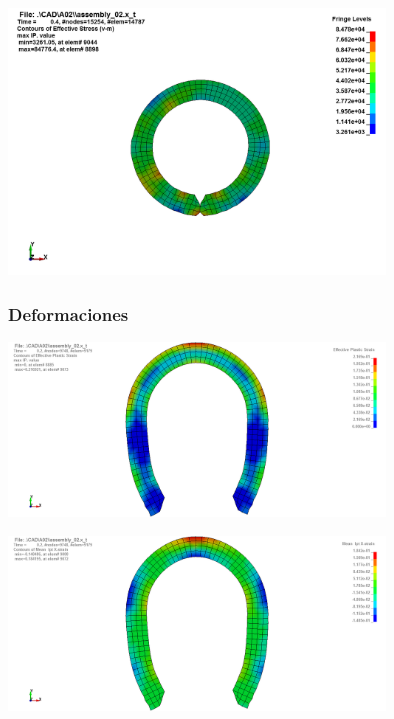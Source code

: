\begin{center}
\includegraphics[width=0.75\textwidth]{src/ch4/von_mises_02.png}
\label{fig:von_mises_01}
\end{center}


\subsubsection{Deformaciones}

\begin{center}
\includegraphics[width=0.75\textwidth]{src/ch4/efective_plastic_strain_01.png}
\label{fig:efective_plastic_strain}
\end{center}

\begin{center}
\includegraphics[width=0.75\textwidth]{src/ch4/strain_x_01.png}
\label{fig:efective_plastic_strain}
\end{center}

